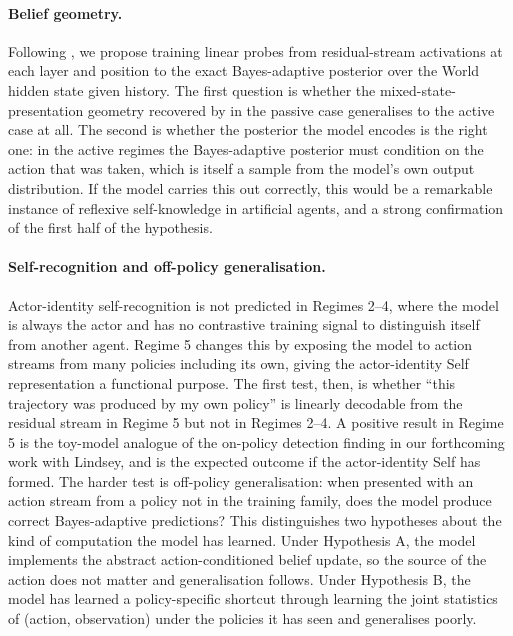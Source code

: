 \documentclass[11pt]{article}
\begin{document}
\paragraph{Belief geometry.} Following \citep{shai2024belief}, we propose training linear probes from residual-stream activations at each layer and position to the exact Bayes-adaptive posterior over the World hidden state given history. The first question is whether the mixed-state-presentation geometry recovered by \citep{shai2024belief} in the passive case generalises to the active case at all. The second is whether the posterior the model encodes is the right one: in the active regimes the Bayes-adaptive posterior must condition on the action that was taken, which is itself a sample from the model's own output distribution. If the model carries this out correctly, this would be a remarkable instance of reflexive self-knowledge in artificial agents, and a strong confirmation of the first half of the hypothesis.





\paragraph{Self-recognition and off-policy generalisation.} Actor-identity self-recognition is not predicted in Regimes 2--4, where the model is always the actor and has no contrastive training signal to distinguish itself from another agent. Regime 5 changes this by exposing the model to action streams from many policies including its own, giving the actor-identity Self representation a functional purpose. The first test, then, is whether ``this trajectory was produced by my own policy'' is linearly decodable from the residual stream in Regime 5 but not in Regimes 2--4. A positive result in Regime 5 is the toy-model analogue of the on-policy detection finding in our forthcoming work with Lindsey, and is the expected outcome if the actor-identity Self has formed. The harder test is off-policy generalisation: when presented with an action stream from a policy not in the training family, does the model produce correct Bayes-adaptive predictions? This distinguishes two hypotheses about the kind of computation the model has learned. Under Hypothesis A, the model implements the abstract action-conditioned belief update, so the source of the action does not matter and generalisation follows. Under Hypothesis B, the model has learned a policy-specific shortcut through learning the joint statistics of (action, observation) under the policies it has seen and generalises poorly.
\end{document}
